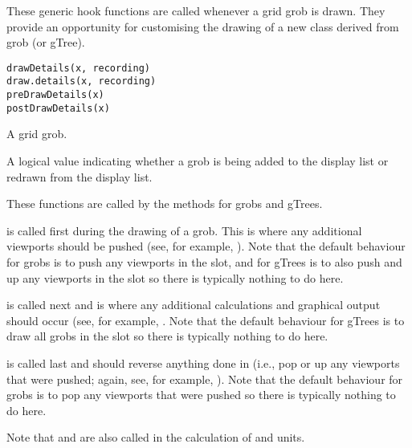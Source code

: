 %
\begin{Description}\relax
These generic hook functions are called whenever a grid grob is drawn.
They provide an opportunity for customising the drawing of a
new class derived from grob (or gTree).
\end{Description}
%
\begin{Usage}
\begin{verbatim}
drawDetails(x, recording)
draw.details(x, recording)
preDrawDetails(x)
postDrawDetails(x)
\end{verbatim}
\end{Usage}
%
\begin{Arguments}
\begin{ldescription}
\item[\code{x}]  A grid grob. 
\item[\code{recording}]  A logical value indicating whether a grob
is being added to the display list or redrawn from the display list. 
\end{ldescription}
\end{Arguments}
%
\begin{Details}\relax
These functions are called by the  methods for grobs
and gTrees.

 is called first during the drawing of a grob.
This is where any additional viewports should be pushed (see,
for example, ).  Note that
the default behaviour for grobs is to push any viewports in the
 slot, and for gTrees is to also push and up any viewports in the
 slot so there is typically nothing to do here.

 is called next and is where any additional
calculations and graphical output should occur (see, for example,
.  Note that the default behaviour
for gTrees is to draw all grobs in the  slot
so there is typically nothing to do here.

 is called last and should reverse anything
done in  (i.e., pop or up any viewports that were
pushed;  again, see,
for example, ).  Note that the
default behaviour for grobs is to pop any viewports that were pushed
so there is typically nothing to do here.

Note that  and  are
also called in the calculation of  and
 units.
\end{Details}
